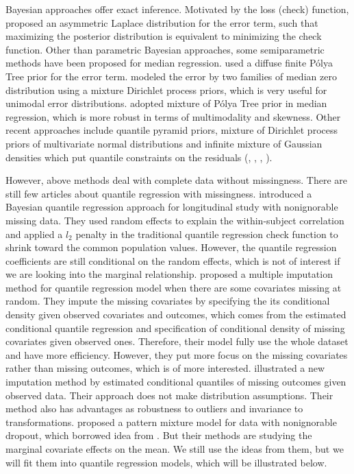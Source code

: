 \documentclass[12pt]{article}
\newcommand{\polya}{P\'{o}lya}
\begin{document}
Bayesian approaches offer exact inference. Motivated by the loss
(check) function, \citet{yu2001} proposed an asymmetric Laplace
distribution for the error term, such that maximizing the posterior
distribution is equivalent to minimizing the check function. Other
than parametric Bayesian approaches, some semiparametric methods have
been proposed for median regression. \citet{walker1999} used a diffuse
finite \polya{} Tree prior for the error term. \citet{kottas2001}
modeled the error by two families of median zero distribution using a
mixture Dirichlet process priors, which is very useful for unimodal
error distributions. \citet{hanson2002} adopted mixture of \polya{}
Tree prior in median regression, which is more robust in terms of
multimodality and skewness. Other recent approaches include quantile
pyramid priors, mixture of Dirichlet process priors of multivariate
normal distributions and infinite mixture of Gaussian densities which
put quantile constraints on the residuals (\citet{hjort2007},
\citet{hjort2009}, \citet{kottas2009}, \citet{reich2010}).

However, above methods deal with complete data without missingness.
There are still few articles about quantile regression with
missingness.  \citet{yuan2010} introduced a Bayesian quantile
regression approach for longitudinal study with nonignorable missing
data. They used random effects to explain the within-subject
correlation and applied a $l_2$ penalty in the traditional quantile
regression check function to shrink toward the common population
values. However, the quantile regression coefficients are still
conditional on the random effects, which is not of interest if we are
looking into the marginal relationship.  \citet{wei2012} proposed a
multiple imputation method for quantile regression model when there
are some covariates missing at random. They impute the missing
covariates by specifying the its conditional density given observed
covariates and outcomes, which comes from the estimated conditional
quantile regression and specification of conditional density of
missing covariates given observed ones.  Therefore, their model fully
use the whole dataset and have more efficiency. However, they put more
focus on the missing covariates rather than missing outcomes, which is
of more interested.  \cite{bottai2013} illustrated a new imputation
method by estimated conditional quantiles of missing outcomes given
observed data. Their approach does not make distribution
assumptions. Their method also has advantages as robustness to
outliers and invariance to transformations.
\citet{roy2008} proposed a pattern mixture model for data with
nonignorable dropout, which borrowed idea from \citet{heagerty1999}.
But their methods are studying the marginal covariate effects on the
mean. We still use the ideas from them, but we will fit them into
quantile regression models, which will be illustrated below.
\end{document}
